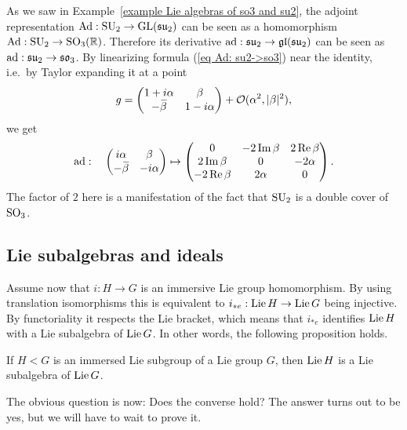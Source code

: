 \begin{example}
    As we saw in Example~\ref{example Lie algebras of so3 and su2}, the adjoint representation $\mathrm{Ad}:\operatorname{SU}_2\to \operatorname{GL}(\mathfrak{su}_2)$ can be seen as a homomorphism $\mathrm{Ad}:\operatorname{SU}_2\to \operatorname{SO}_3(\mathbb{R})$. Therefore its derivative $\mathrm{ad}:\mathfrak{su}_2\to \mathfrak{gl}(\mathfrak{su}_2)$ can be seen as $\mathrm{ad}:\mathfrak{su}_2\to \mathfrak{so}_3$. By linearizing formula (\ref{eq Ad: su2->so3}) near the identity, i.e.~by Taylor expanding it at a point
    \[g=
    \begin{pmatrix}
        1+i\alpha &\beta \\
        -\wb{\beta} & 1-i\alpha
    \end{pmatrix}+\calO(\alpha^2,|\beta|^2),
    \]
    we get 
    \[\ad:\quad \begin{pmatrix}
        i\alpha&\beta\\-\wb{\beta}&-i\alpha
    \end{pmatrix}\mapsto 
    \begin{pmatrix}
        0&-2\Im \beta & 2\Re\beta\\
        2\Im \beta & 0 & -2\alpha \\
        -2\Re\beta & 2\alpha & 0
    \end{pmatrix}.\label{eq ad: su2->so3}\]
    The factor of $2$ here is a manifestation of the fact that $\operatorname{SU}_2$ is a double cover of $\operatorname{SO}_3$.
\end{example}








\subsection{Lie subalgebras and ideals}

Assume now that $i:H\to G$ is an immersive Lie group homomorphism. By using translation isomorphisms this is equivalent to $i_{\ast e}:\operatorname{Lie} H\to \operatorname{Lie} G$ being injective. By functoriality it respects the Lie bracket, which means that $i_{\ast e}$ identifies $\operatorname{Lie} H$ with a Lie subalgebra of $\operatorname{Lie} G$. In other words, the following proposition holds.

\begin{prop}
    If $H<G$ is an immersed Lie subgroup of a Lie group $G$, then $\operatorname{Lie} H$ is a Lie subalgebra of $\operatorname{Lie} G$.
\end{prop}

The obvious question is now: Does the converse hold? The answer turns out to be yes, but we will have to wait to prove it.

